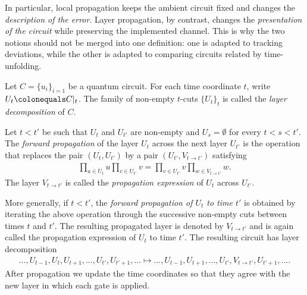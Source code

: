 In particular, local propagation keeps the ambient circuit fixed and changes the \emph{description of the error}. Layer propagation, by contrast, changes the \emph{presentation of the circuit} while preserving the implemented channel. This is why the two notions should not be merged into one definition: one is adapted to tracking deviations, while the other is adapted to comparing circuits related by time-unfolding.

\begin{definition}
  Let $C = \{u_{i}\}_{i=1}$ be a quantum circuit. For each time coordinate $t$, write $U_{t}\colonequals C|_{t}$. The family of non-empty $t$-cuts $\{U_{t}\}_{t}$ is called the \textit{layer decomposition} of $C$.

  Let $t<t'$ be such that $U_t$ and $U_{t'}$ are non-empty and $U_s=\emptyset$ for every $t<s<t'$. The \textit{forward propagation} of the layer $U_{t}$ across the next layer $U_{t'}$ is the operation that replaces the pair $(U_{t},U_{t'})$ by a pair $(U_{t'},V_{t\to t'})$ satisfying
  \begin{equation*}
    \begin{split}
      \prod_{u\in U_{t}}u\prod_{v\in U_{t'}}v
      =
      \prod_{v\in U_{t'}}v\prod_{w\in V_{t\to t'}}w.
    \end{split}
  \end{equation*}
  The layer $V_{t\to t'}$ is called the \textit{propagation expression} of $U_{t}$ across $U_{t'}$.

  More generally, if $t<t'$, the \textit{forward propagation of $U_t$ to time $t'$} is obtained by iterating the above operation through the successive non-empty cuts between times $t$ and $t'$. The resulting propagated layer is denoted by $V_{t\to t'}$ and is again called the propagation expression of $U_t$ to time $t'$. The resulting circuit has layer decomposition
  \begin{equation*}
    \begin{split}
      \ldots,U_{t-1},U_t,U_{t+1},\ldots,U_{t'},U_{t'+1},\ldots
      \mapsto
      \ldots,U_{t-1},U_{t+1},\ldots,U_{t'},V_{t\to t'},U_{t'+1},\ldots.
    \end{split}
  \end{equation*}
  After propagation we update the time coordinates so that they agree with the new layer in which each gate is applied.
\end{definition}

